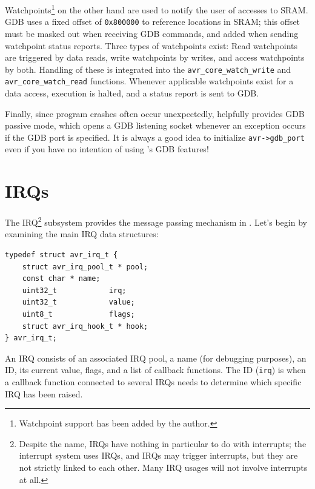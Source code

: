 Watchpoints\footnote{Watchpoint support has been added by the author.}
on the other hand are used to notify the user of accesses to \ac{SRAM}.
\ac{GDB} uses a fixed offset of \lstinline|0x800000| to reference locations in
\ac{SRAM}; this offset must be masked out when receiving \ac{GDB} commands, and
added when sending watchpoint status reports.
Three types of watchpoints exist: Read watchpoints are triggered by data reads,
write watchpoints by writes, and access watchpoints by both. Handling of these
is integrated into the \lstinline|avr_core_watch_write| and
\lstinline|avr_core_watch_read| functions. Whenever applicable watchpoints exist
for a data access, execution is halted, and a status report is sent to \ac{GDB}.

Finally, since program crashes often occur unexpectedly, \simavr helpfully
provides \ac{GDB} passive mode, which
opens a \ac{GDB} listening socket whenever an exception occurs if the \ac{GDB}
port is specified. It is always a good idea to initialize \lstinline|avr->gdb_port| even
if you have no intention of using \simavr's \ac{GDB} features!


\section{\acfp{IRQ}}

The \acf{IRQ}\footnote{
%
Despite the name, \acp{IRQ} have nothing in particular to do with interrupts;
the interrupt system uses \acp{IRQ}, and \acp{IRQ} may trigger interrupts, but
they are not strictly linked to each other. Many \ac{IRQ} usages will not involve
interrupts at all.}
%
subsystem provides the message passing mechanism in \simavr. Let's begin
by examining the main \ac{IRQ} data structures:

\begin{lstlisting}
typedef struct avr_irq_t {
    struct avr_irq_pool_t * pool;
    const char * name;
    uint32_t            irq;
    uint32_t            value;
    uint8_t             flags;
    struct avr_irq_hook_t * hook;
} avr_irq_t;
\end{lstlisting}

An \ac{IRQ} consists of an associated \ac{IRQ} pool, a name (for debugging
purposes), an ID, its current value, flags, and a list of callback functions.
The ID (\lstinline|irq|) is when a callback function connected to several \acp{IRQ}
needs to determine which specific \ac{IRQ} has been raised.

